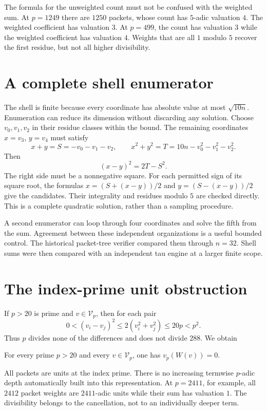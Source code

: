 The formula for the unweighted count must not be confused with the weighted sum. At $p=1249$ there are $1250$ packets, whose count has $5$-adic valuation $4$. The weighted coefficient has valuation $3$. At $p=499$, the count has valuation $3$ while the weighted coefficient has valuation $4$. Weights that are all $1$ modulo $5$ recover the first residue, but not all higher divisibility.

\section{A complete shell enumerator}
The shell is finite because every coordinate has absolute value at most $\sqrt{10n}$. Enumeration can reduce its dimension without discarding any solution. Choose $v_0,v_1,v_2$ in their residue classes within the bound. The remaining coordinates $x=v_3$, $y=v_4$ must satisfy
\[
x+y=S=-v_0-v_1-v_2,\qquad
x^2+y^2=T=10n-v_0^2-v_1^2-v_2^2.
\]
Then
\[
(x-y)^2=2T-S^2.
\]
The right side must be a nonnegative square. For each permitted sign of its square root, the formulas $x=(S+(x-y))/2$ and $y=(S-(x-y))/2$ give the candidates. Their integrality and residues modulo $5$ are checked directly. This is a complete quadratic solution, rather than a sampling procedure.

A second enumerator can loop through four coordinates and solve the fifth from the sum. Agreement between these independent organizations is a useful bounded control. The historical packet-tree verifier compared them through $n=32$. Shell sums were then compared with an independent tau engine at a larger finite scope.


\section{The index-prime unit obstruction}
If $p>20$ is prime and $v\in\mathcal V_p$, then for each pair
\[
0<(v_i-v_j)^2\le2(v_i^2+v_j^2)\le20p<p^2.
\]
Thus $p$ divides none of the differences and does not divide $288$. We obtain
\begin{proposition}\label{prop:indexunit}
For every prime $p>20$ and every $v\in\mathcal V_p$, one has $v_p(W(v))=0$.
\end{proposition}
All packets are units at the index prime. There is no increasing termwise $p$-adic depth automatically built into this representation. At $p=2411$, for example, all $2412$ packet weights are $2411$-adic units while their sum has valuation $1$. The divisibility belongs to the cancellation, not to an individually deeper term.

